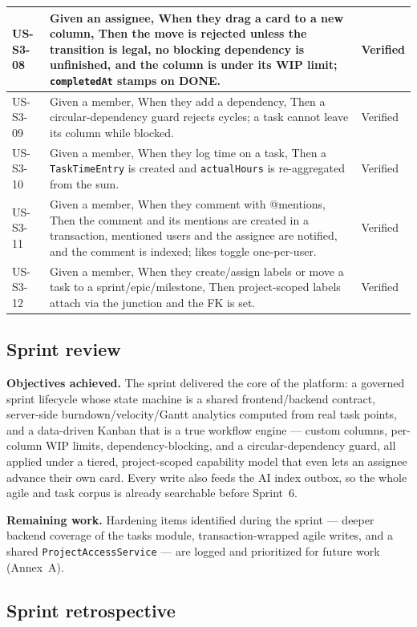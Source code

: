 \begin{longtable}{@{}p{1.8cm}p{8.3cm}p{3.8cm}@{}}
\midrule
US-S3-08 & Given an assignee, When they drag a card to a new column, Then the move is rejected unless the transition is legal, no blocking dependency is unfinished, and the column is under its WIP limit; \texttt{completedAt} stamps on DONE. & \pass{} Verified \\
\midrule
US-S3-09 & Given a member, When they add a dependency, Then a circular-dependency guard rejects cycles; a task cannot leave its column while blocked. & \pass{} Verified \\
\midrule
US-S3-10 & Given a member, When they log time on a task, Then a \texttt{TaskTimeEntry} is created and \texttt{actualHours} is re-aggregated from the sum. & \pass{} Verified \\
\midrule
US-S3-11 & Given a member, When they comment with @mentions, Then the comment and its mentions are created in a transaction, mentioned users and the assignee are notified, and the comment is indexed; likes toggle one-per-user. & \pass{} Verified \\
\midrule
US-S3-12 & Given a member, When they create/assign labels or move a task to a sprint/epic/milestone, Then project-scoped labels attach via the junction and the FK is set. & \pass{} Verified \\
\end{longtable}

\subsection{Sprint review}

\textbf{Objectives achieved.} The sprint delivered the core of the platform: a governed
sprint lifecycle whose state machine is a shared frontend/backend contract, server-side
burndown/velocity/Gantt analytics computed from real task points, and a data-driven Kanban that
is a true workflow engine --- custom columns, per-column WIP limits, dependency-blocking, and
a circular-dependency guard, all applied under a tiered, project-scoped capability model that
even lets an assignee advance their own card. Every write also feeds the AI index outbox, so the
whole agile and task corpus is already searchable before Sprint~6.

\textbf{Remaining work.} Hardening items identified during the sprint --- deeper backend
coverage of the tasks module, transaction-wrapped agile writes, and a shared
\texttt{ProjectAccessService} --- are logged and prioritized for future work (Annex~A).

\subsection{Sprint retrospective}

